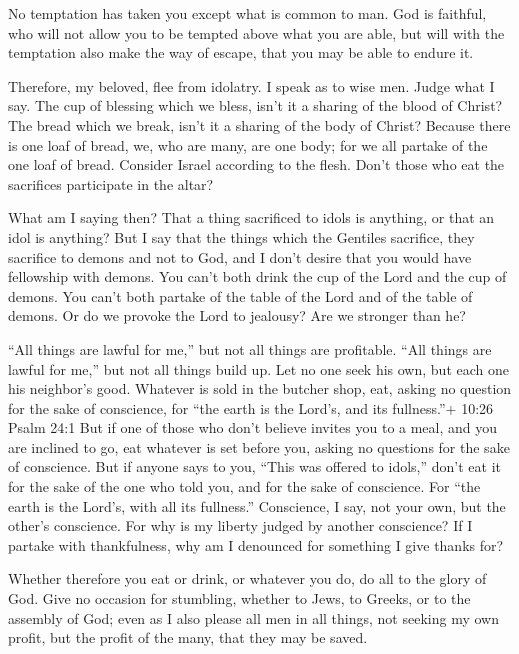  No temptation has taken you except what is common to man.
God is faithful, who will not allow you to be tempted above what you are
able, but will with the temptation also make the way of escape, that you
may be able to endure it.

 Therefore, my beloved, flee from idolatry.  I
speak as to wise men. Judge what I say.  The cup of
blessing which we bless, isn't it a sharing of the blood of Christ? The
bread which we break, isn't it a sharing of the body of Christ?
 Because there is one loaf of bread, we, who are many, are
one body; for we all partake of the one loaf of bread. 
Consider Israel according to the flesh. Don't those who eat the
sacrifices participate in the altar?

 What am I saying then? That a thing sacrificed to idols is
anything, or that an idol is anything?  But I say that the
things which the Gentiles sacrifice, they sacrifice to demons and not to
God, and I don't desire that you would have fellowship with demons.
 You can't both drink the cup of the Lord and the cup of
demons. You can't both partake of the table of the Lord and of the table
of demons.  Or do we provoke the Lord to jealousy? Are we
stronger than he?

 ``All things are lawful for me,'' but not all things are
profitable. ``All things are lawful for me,'' but not all things build
up.  Let no one seek his own, but each one his neighbor's
good.  Whatever is sold in the butcher shop, eat, asking no
question for the sake of conscience,  for ``the earth is
the Lord's, and its fullness.''+ 10:26 Psalm 24:1  But if
one of those who don't believe invites you to a meal, and you are
inclined to go, eat whatever is set before you, asking no questions for
the sake of conscience.  But if anyone says to you, ``This
was offered to idols,'' don't eat it for the sake of the one who told
you, and for the sake of conscience. For ``the earth is the Lord's, with
all its fullness.''  Conscience, I say, not your own, but
the other's conscience. For why is my liberty judged by another
conscience?  If I partake with thankfulness, why am I
denounced for something I give thanks for?

 Whether therefore you eat or drink, or whatever you do, do
all to the glory of God.  Give no occasion for stumbling,
whether to Jews, to Greeks, or to the assembly of God; 
even as I also please all men in all things, not seeking my own profit,
but the profit of the many, that they may be saved.


